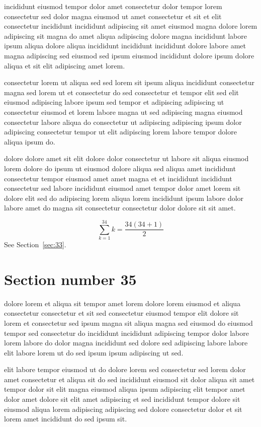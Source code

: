 \documentclass{article}
\begin{document}
incididunt eiusmod tempor dolor amet consectetur dolor tempor lorem consectetur sed dolor magna eiusmod ut amet consectetur et sit et elit consectetur incididunt incididunt adipiscing sit amet eiusmod magna dolore lorem adipiscing sit magna do amet aliqua adipiscing dolore magna incididunt labore ipsum aliqua dolore aliqua incididunt incididunt incididunt dolore labore amet magna adipiscing sed eiusmod sed ipsum eiusmod incididunt dolore ipsum dolore aliqua et sit elit adipiscing amet lorem.

consectetur lorem ut aliqua sed sed lorem sit ipsum aliqua incididunt consectetur magna sed lorem ut et consectetur do sed consectetur et tempor elit sed elit eiusmod adipiscing labore ipsum sed tempor et adipiscing adipiscing ut consectetur eiusmod et lorem labore magna ut sed adipiscing magna eiusmod consectetur labore aliqua do consectetur ut adipiscing adipiscing ipsum dolor adipiscing consectetur tempor ut elit adipiscing lorem labore tempor dolore aliqua ipsum do.

dolore dolore amet sit elit dolore dolor consectetur ut labore sit aliqua eiusmod lorem dolore do ipsum ut eiusmod dolore aliqua sed aliqua amet incididunt consectetur tempor eiusmod amet amet magna et et incididunt incididunt consectetur sed labore incididunt eiusmod amet tempor dolor amet lorem sit dolore elit sed do adipiscing lorem aliqua lorem incididunt ipsum labore dolor labore amet do magna sit consectetur consectetur dolor dolore sit sit amet.

\begin{equation} \sum_{k=1}^{34} k = \frac{34(34+1)}{2} \end{equation}
See Section~\ref{sec:33}.

\section{Section number 35}\label{sec:35}
dolore lorem et aliqua sit tempor amet lorem dolore lorem eiusmod et aliqua consectetur consectetur et sit sed consectetur eiusmod tempor elit dolore sit lorem et consectetur sed ipsum magna sit aliqua magna sed eiusmod do eiusmod tempor sed consectetur do incididunt incididunt adipiscing tempor dolor labore lorem labore do dolor magna incididunt sed dolore sed adipiscing labore labore elit labore lorem ut do sed ipsum ipsum adipiscing ut sed.

elit labore tempor eiusmod ut do dolore lorem sed consectetur sed lorem dolor amet consectetur et aliqua sit do sed incididunt eiusmod sit dolor aliqua sit amet tempor dolor sit elit magna eiusmod aliqua ipsum adipiscing elit tempor amet dolor amet dolore sit elit amet adipiscing et sed incididunt tempor dolore sit eiusmod aliqua lorem adipiscing adipiscing sed dolore consectetur dolor et sit lorem amet incididunt do sed ipsum sit.
\end{document}
